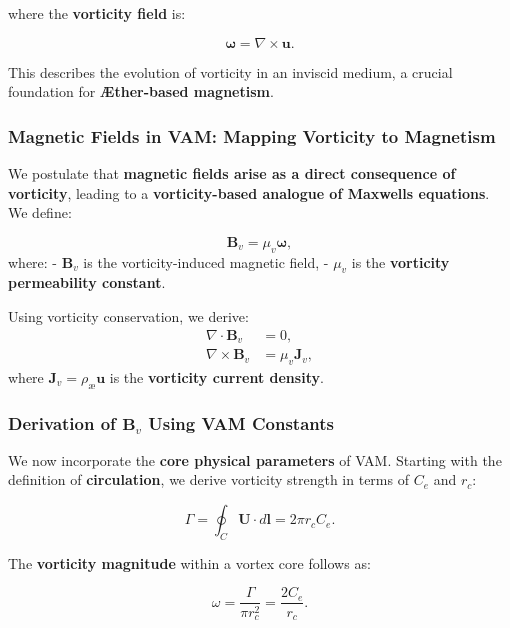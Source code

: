     where the \textbf{vorticity field} is:

    \begin{equation*}
        \boldsymbol{\omega} = \nabla \times \boldsymbol{u}.
    \end{equation*}

    This describes the evolution of vorticity in an inviscid medium, a crucial foundation for \textbf{Æther-based magnetism}.

    \subsubsection*{Magnetic Fields in VAM: Mapping Vorticity to Magnetism}
    We postulate that \textbf{magnetic fields arise as a direct consequence of vorticity}, leading to a \textbf{vorticity-based analogue of Maxwell\rqs s equations}. We define:

    \begin{equation*}
        \boldsymbol{B}_v = \mu_v \boldsymbol{\omega},
    \end{equation*}
    where:
    - \( \boldsymbol{B}_v \) is the vorticity-induced magnetic field,
    - \( \mu_v \) is the \textbf{vorticity permeability constant}.

    Using vorticity conservation, we derive:
    \begin{align}
        \nabla \cdot \boldsymbol{B}_v &= 0, \\
        \nabla \times \boldsymbol{B}_v &= \mu_v \boldsymbol{J}_v,
    \end{align}
    where \( \boldsymbol{J}_v = \rho_\text{\ae} \boldsymbol{u} \) is the \textbf{vorticity current density}.

    \subsubsection*{Derivation of \( \boldsymbol{B}_v \) Using VAM Constants}
    We now incorporate the \textbf{core physical parameters} of VAM. Starting with the definition of \textbf{circulation}, we derive vorticity strength in terms of \( C_e \) and \( r_c \):

    \begin{equation*}
        \Gamma = \oint_C \mathbf{U} \cdot d\mathbf{l} = 2\pi r_c C_e.
    \end{equation*}

    The \textbf{vorticity magnitude} within a vortex core follows as:

    \begin{equation*}
        \omega = \frac{\Gamma}{\pi r_c^2} = \frac{2 C_e}{r_c}.
    \end{equation*}

